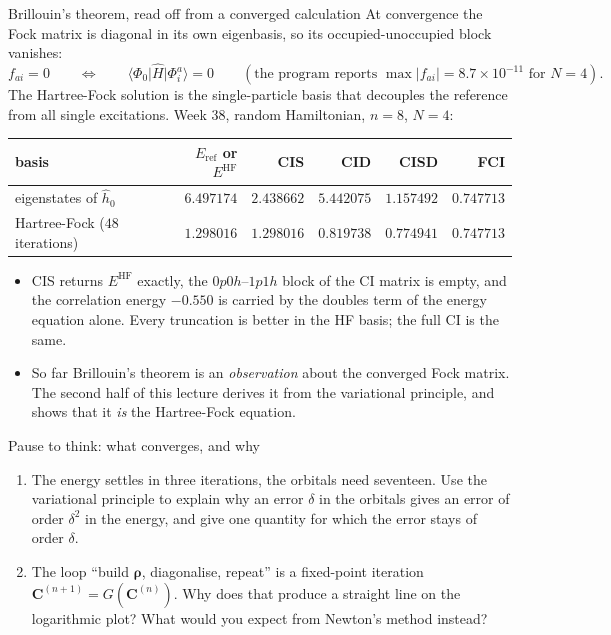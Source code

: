 \documentclass[aspectratio=169,10pt]{beamer}
\newcounter{thinkctr}
\newcommand{\thinkq}[2]{%
  \stepcounter{thinkctr}%
  \begin{tcolorbox}[colback=palewarm,colframe=warm,title={\bfseries Pause to think \#\thethinkctr\hfill\mdseries\small(about #1 min -- discuss with your neighbour)},fonttitle=\bfseries]
  #2
  \end{tcolorbox}}
\newcommand{\ket}[1]{\vert #1\rangle}
\newcommand{\bra}[1]{\langle #1\vert}
\begin{document}
\begin{frame}{Brillouin's theorem, read off from a converged calculation}
  \footnotesize
  At convergence the Fock matrix is diagonal in its own eigenbasis, so its occupied-unoccupied block vanishes:
  \[
    f_{ai}=0\qquad\Longleftrightarrow\qquad\bra{\Phi_0}\hat{H}\ket{\Phi_i^a}=0
    \qquad(\text{the program reports }\max|f_{ai}|=8.7\times10^{-11}\text{ for }N=4).
  \]
  The Hartree-Fock solution is \alert{the single-particle basis that decouples the reference from all single excitations}. Week 38, random Hamiltonian, $n=8$, $N=4$:
  \begin{center}\scriptsize
  \renewcommand{\arraystretch}{1.15}
  \begin{tabular}{lrrrrr}
    \toprule
    basis & $E_{\mathrm{ref}}$ or $E^{\mathrm{HF}}$ & CIS & CID & CISD & FCI\\
    \midrule
    eigenstates of $\hat{h}_0$ & $6.497174$ & $2.438662$ & $5.442075$ & $1.157492$ & $0.747713$\\
    Hartree-Fock ($48$ iterations) & $1.298016$ & $1.298016$ & $0.819738$ & $0.774941$ & $0.747713$\\
    \bottomrule
  \end{tabular}
  \end{center}
  \begin{itemize}
    \item CIS returns $E^{\mathrm{HF}}$ exactly, the $0p0h$--$1p1h$ block of the CI matrix is empty, and the correlation energy $-0.550$ is carried by the doubles term of the energy equation alone. Every truncation is better in the HF basis; the full CI is the same.
    \item So far Brillouin's theorem is an \emph{observation} about the converged Fock matrix. The second half of this lecture derives it from the variational principle, and shows that it \emph{is} the Hartree-Fock equation.
  \end{itemize}
\end{frame}

\begin{frame}{Pause to think: what converges, and why}
  \thinkq{3}{
  \begin{enumerate}
    \item The energy settles in three iterations, the orbitals need seventeen. Use the variational principle to explain why an error $\delta$ in the orbitals gives an error of order $\delta^2$ in the energy, and give one quantity for which the error stays of order $\delta$.
    \item The loop ``build $\bm{\rho}$, diagonalise, repeat'' is a fixed-point iteration $\bm{C}^{(n+1)}=G(\bm{C}^{(n)})$. Why does that produce a straight line on the logarithmic plot? What would you expect from Newton's method instead?
  \end{enumerate}}
\end{frame}
\end{document}
